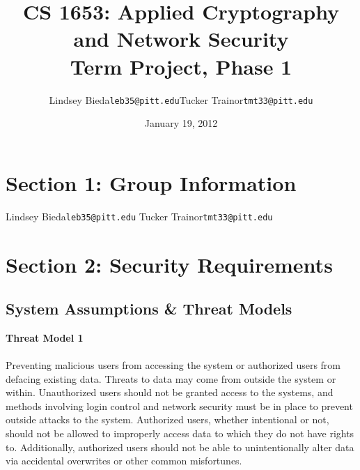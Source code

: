 \documentclass[11pt]{article}
\title{CS 1653: Applied Cryptography and Network Security\\Term Project, Phase 1}
\author{Lindsey Bieda\quad\texttt{leb35@pitt.edu}\qquad Tucker Trainor\quad\texttt{tmt33@pitt.edu}}
\date{January 19, 2012} %
\begin{document}
\maketitle
\section{Section 1: Group Information}
Lindsey Bieda\qquad\texttt{leb35@pitt.edu}
\newline
Tucker Trainor\qquad\texttt{tmt33@pitt.edu}
\section{Section 2: Security Requirements}
\subsection{System Assumptions \& Threat Models}
\textbf{Threat Model 1}\\
\\
Preventing malicious users from accessing the system or authorized users from defacing existing data. Threats to data may come from outside the system or within. Unauthorized users should not be granted access to the systems, and methods involving login control and network security must be in place to prevent outside attacks to the system. Authorized users, whether intentional or not, should not be allowed to improperly access data to which they do not have rights to. Additionally, authorized users should not be able to unintentionally alter data via accidental overwrites or other common misfortunes.
\end{document}
